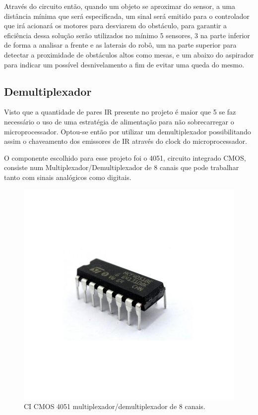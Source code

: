     Através do circuito então, quando um objeto se aproximar do sensor, a uma distância mínima que será especificada, um sinal será emitido para o controlador que irá acionará os motores para desviarem do obstáculo, para garantir a eficiência dessa solução serão utilizados no mínimo 5 sensores, 3 na parte inferior de forma a analisar a frente e as laterais do robô, um na parte superior para detectar a proximidade de obstáculos altos como mesas, e um abaixo do aspirador para indicar um possível desnivelamento a fim de evitar uma queda do mesmo.
                               
  \subsection{Demultiplexador}                        
  \label{sub:demultiplexador}
    Visto que a quantidade de pares IR presente no projeto é maior que 5 se faz necessário o uso de uma estratégia de alimentação para não sobrecarregar o microprocessador. Optou-se então por utilizar um demultiplexador possibilitando assim o chaveamento dos emissores de IR através do clock do microprocessador.

    O componente escolhido para esse projeto foi o 4051, circuito integrado CMOS, consiste num Multiplexador/Demultiplexador de 8 canais que pode trabalhar tanto com sinais analógicos como digitais.\cite{newtoncbraga}

  \begin{figure}[H]                                                           
    \centering                                                                
    \includegraphics[scale=0.2]{figuras/multiplexador.png}             
    \caption{ CI CMOS 4051 multiplexador/demultiplexador de 8 canais.} 
    \label{img:multiplexador}                                            
  \end{figure}                                                                

